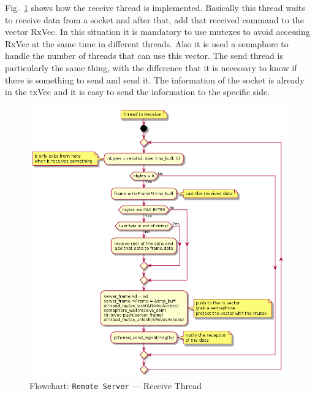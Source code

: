 Fig.~\ref{fig:flow-rs-recv} shows how the receive thread is implemented.
Basically this thread waits to receive data from a socket and after that, add that received command to the vector RxVec. In this situation it is mandatory to use mutexes to avoid accessing RxVec at the same time in different threads. Also it is used a semaphore to handle the number of threads that can use this vector.
The send thread is particularly the same thing, with the difference that it is necessary to know if there is something to send and send it. The information of the socket is already in the txVec and it is easy to send the information to the specific side.
%
\begin{figure}[htb!]
\centering
    \includegraphics[width=0.7\columnwidth]{./img/flow-rs-recv.png}
  \caption{Flowchart: \texttt{Remote Server} --- Receive Thread}%
\label{fig:flow-rs-recv}
\end{figure}

